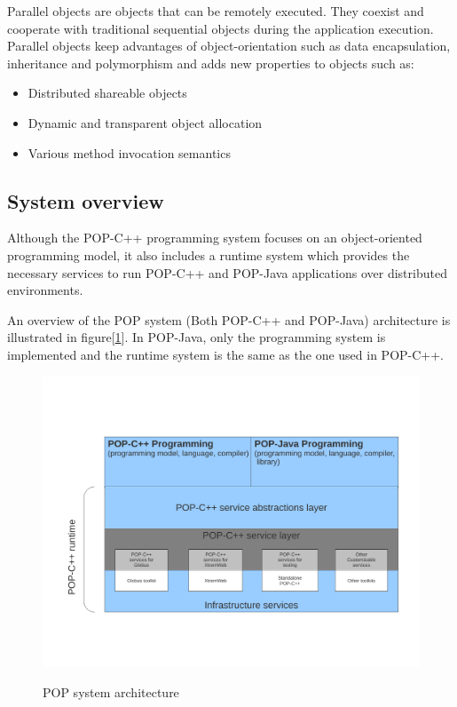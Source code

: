 Parallel objects are objects that can be remotely executed. They coexist and
cooperate with traditional sequential objects during the application execution.
Parallel objects keep advantages of object-orientation such as data
encapsulation, inheritance and polymorphism and adds new properties to
objects such as:

\begin{itemize}
	\item Distributed shareable objects
	\item Dynamic and transparent object allocation
	\item Various method invocation semantics
\end{itemize}

\subsection{System overview}
Although the POP-C++ programming system focuses on an object-oriented
programming model, it also includes a runtime system which provides the necessary services to run POP-C++ and POP-Java applications over distributed environments. \s

An overview of the POP system (Both POP-C++ and POP-Java) architecture is illustrated in figure[\ref{fig:popsystem}]. In POP-Java, only the programming system is implemented and the runtime system is the same as the one used in POP-C++.


\begin{figure}[ht]
	\caption{POP system architecture}
  	\centering
  	\includegraphics[scale=0.5]{architecture.pdf}
	\label{fig:popsystem}
\end{figure}


